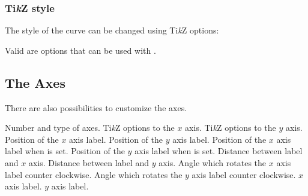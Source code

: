 \documentclass[load-preamble+]{cnltx-doc}
\newcommand*\TikZ{Ti\textit{k}Z}
\begin{document}
\begin{example}
  \begin{endiagram}
  \end{endiagram}
\end{example}

\subsubsection{\TikZ{} style}

The style of the curve can be changed using \TikZ{} options:
\begin{options}
  \Default
     Valid are options that can be used with .
\end{options}
\begin{example}
  \begin{endiagram}
  \end{endiagram}
\end{example}

\subsection{The Axes}

There are also possibilities to customize the axes.
\begin{options}
    Number and type of axes.
  \Default
    \TikZ{} options to the $x$ axis.
  \Default
    \TikZ{} options to the $y$ axis.
    Position of the $x$ axis label.
    Position of the $y$ axis label.
    Position of the $x$ axis label when  is set.
    Position of the $y$ axis label when  is set.
  \Default{0pt}
    Distance between label and $x$ axis.
  \Default{0pt}
    Distance between label and $y$ axis.
    Angle which rotates the $x$ axis label counter clockwise.
    Angle which rotates the $y$ axis label counter clockwise.
    $x$ axis label.
   $y$ axis label.
\end{options}
\end{document}
